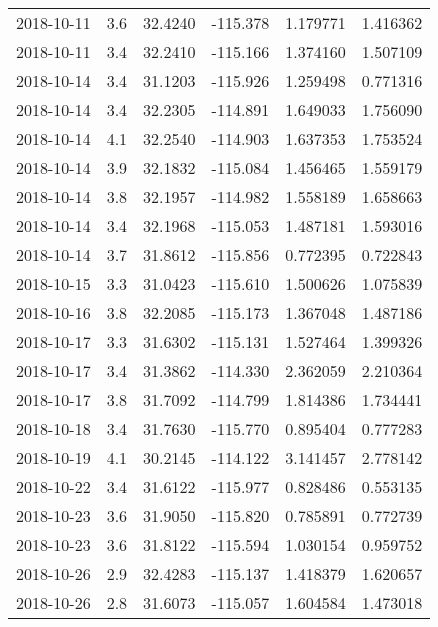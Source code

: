 \begin{tabular}{lrrrrr}
2018-10-11 &       3.6 &  32.4240 &  -115.378 &         1.179771 &         1.416362 \\
2018-10-11 &       3.4 &  32.2410 &  -115.166 &         1.374160 &         1.507109 \\
2018-10-14 &       3.4 &  31.1203 &  -115.926 &         1.259498 &         0.771316 \\
2018-10-14 &       3.4 &  32.2305 &  -114.891 &         1.649033 &         1.756090 \\
2018-10-14 &       4.1 &  32.2540 &  -114.903 &         1.637353 &         1.753524 \\
2018-10-14 &       3.9 &  32.1832 &  -115.084 &         1.456465 &         1.559179 \\
2018-10-14 &       3.8 &  32.1957 &  -114.982 &         1.558189 &         1.658663 \\
2018-10-14 &       3.4 &  32.1968 &  -115.053 &         1.487181 &         1.593016 \\
2018-10-14 &       3.7 &  31.8612 &  -115.856 &         0.772395 &         0.722843 \\
2018-10-15 &       3.3 &  31.0423 &  -115.610 &         1.500626 &         1.075839 \\
2018-10-16 &       3.8 &  32.2085 &  -115.173 &         1.367048 &         1.487186 \\
2018-10-17 &       3.3 &  31.6302 &  -115.131 &         1.527464 &         1.399326 \\
2018-10-17 &       3.4 &  31.3862 &  -114.330 &         2.362059 &         2.210364 \\
2018-10-17 &       3.8 &  31.7092 &  -114.799 &         1.814386 &         1.734441 \\
2018-10-18 &       3.4 &  31.7630 &  -115.770 &         0.895404 &         0.777283 \\
2018-10-19 &       4.1 &  30.2145 &  -114.122 &         3.141457 &         2.778142 \\
2018-10-22 &       3.4 &  31.6122 &  -115.977 &         0.828486 &         0.553135 \\
2018-10-23 &       3.6 &  31.9050 &  -115.820 &         0.785891 &         0.772739 \\
2018-10-23 &       3.6 &  31.8122 &  -115.594 &         1.030154 &         0.959752 \\
2018-10-26 &       2.9 &  32.4283 &  -115.137 &         1.418379 &         1.620657 \\
2018-10-26 &       2.8 &  31.6073 &  -115.057 &         1.604584 &         1.473018 \\

\end{tabular}
